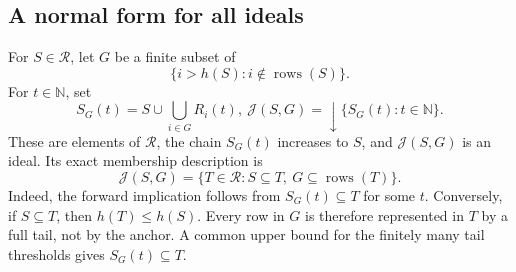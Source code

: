 \documentclass[fleqn,preprint,3p,a4paper]{elsarticle}
\theoremstyle{definition}
\newcommand{\N}{\mathbb N}
\newcommand{\RR}{\mathcal R}
\newcommand{\rows}{\operatorname{rows}}
\begin{document}
\subsection{A normal form for all ideals}
For $S\in\RR$, let $G$ be a finite subset of
\[
 \{i>h(S):i\notin\rows(S)\}.
\]
For $t\in\N$, set
\[
 S_G(t)=S\cup\bigcup_{i\in G}R_i(t),
 ~
 \mathcal J(S,G)={\downarrow}\{S_G(t):t\in\N\}.
\]
These are elements of $\RR$, the chain $S_G(t)$ increases to $S$, and $\mathcal J(S,G)$ is an ideal. Its exact membership description is
\begin{equation}\label{fan:membership}
 \mathcal J(S,G)
 =\{T\in\RR:S\subseteq T,\ G\subseteq\rows(T)\}.
\end{equation}
Indeed, the forward implication follows from $S_G(t)\subseteq T$ for some $t$. Conversely, if $S\subseteq T$, then $h(T)\leq h(S)$. Every row in $G$ is therefore represented in $T$ by a full tail, not by the anchor. A common upper bound for the finitely many tail thresholds gives $S_G(t)\subseteq T$.
\end{document}
